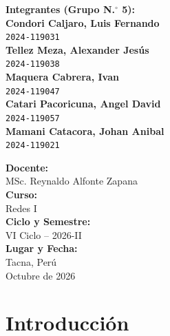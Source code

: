 \documentclass[12pt,a4paper]{article}
\begin{document}
\begin{titlepage}
  \vspace{0.6cm}
  \noindent
  \begin{minipage}[t]{0.56\textwidth}
    {\bfseries\color{colorPrincipal} Integrantes (Grupo N.$^\circ$ 5):}\\[8pt]
    {\color{black}\textbf{Condori Caljaro, Luis Fernando}}\\[1pt]
    {\small\color{black}\texttt{2024-119031}}\\[6pt]
    {\color{black}\textbf{Tellez Meza, Alexander Jesús}}\\[1pt]
    {\small\color{black}\texttt{2024-119038}}\\[6pt]
    {\color{black}\textbf{Maquera Cabrera, Ivan}}\\[1pt]
    {\small\color{black}\texttt{2024-119047}}\\[6pt]
    {\color{black}\textbf{Catari Pacoricuna, Angel David}}\\[1pt]
    {\small\color{black}\texttt{2024-119057}}\\[6pt]
    {\color{black}\textbf{Mamani Catacora, Johan Anibal}}\\[1pt]
    {\small\color{black}\texttt{2024-119021}}
  \end{minipage}%
  \hfill
  \begin{minipage}[t]{0.38\textwidth}
    {\bfseries\color{colorPrincipal} Docente:}\\[2pt]
    {\color{black} MSc. Reynaldo Alfonte Zapana}\\[10pt]
    {\bfseries\color{colorPrincipal} Curso:}\\[2pt]
    {\color{black} Redes I}\\[10pt]
    {\bfseries\color{colorPrincipal} Ciclo y Semestre:}\\[2pt]
    {\color{black} VI Ciclo -- 2026-II}\\[10pt]
    {\bfseries\color{colorPrincipal} Lugar y Fecha:}\\[2pt]
    {\color{black} Tacna, Perú}\\[2pt]
    {\color{black} Octubre de 2026}
  \end{minipage}
\end{titlepage}

\thispagestyle{empty}
\renewcommand{\contentsname}{Índice General}
\tableofcontents
\clearpage

\section{Introducción}
\end{document}

